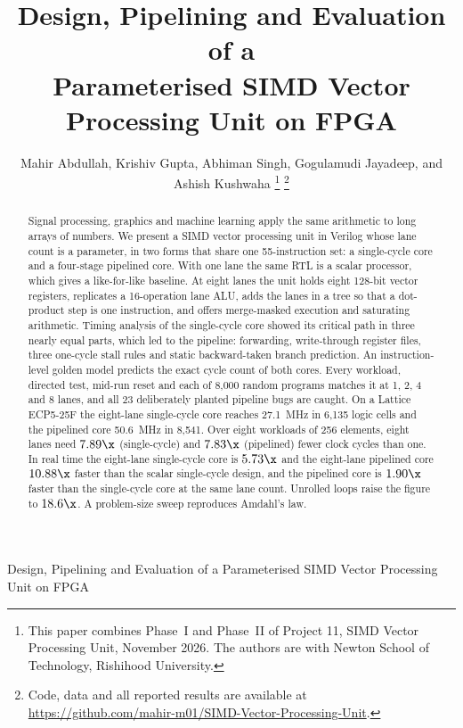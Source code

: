 \title{Design, Pipelining and Evaluation of a\\Parameterised SIMD Vector Processing Unit on FPGA}

\author{Mahir Abdullah, Krishiv Gupta, Abhiman Singh, Gogulamudi Jayadeep, and Ashish Kushwaha%
\thanks{This paper combines Phase~I and Phase~II of Project 11, SIMD Vector Processing Unit, November 2026.
The authors are with Newton School of Technology, Rishihood University.}%
\thanks{Code, data and all reported results are available at
\url{https://github.com/mahir-m01/SIMD-Vector-Processing-Unit}.}}

%
{Design, Pipelining and Evaluation of a Parameterised SIMD Vector Processing Unit on FPGA}

\maketitle

\begin{abstract}
Signal processing, graphics and machine learning apply the same arithmetic to long
arrays of numbers. We present a SIMD vector processing unit in Verilog whose lane
count is a parameter, in two forms that share one 55-instruction set: a
single-cycle core and a four-stage pipelined core. With one lane the same RTL is a
scalar processor, which gives a like-for-like baseline. At eight lanes the unit
holds eight 128-bit vector registers, replicates a 16-operation lane ALU, adds the
lanes in a tree so that a dot-product step is one instruction, and offers
merge-masked execution and saturating arithmetic. Timing analysis of the
single-cycle core showed its critical path in three nearly equal parts, which led to
the pipeline: forwarding, write-through register files, three one-cycle stall rules
and static backward-taken branch prediction. An instruction-level golden model
predicts the exact cycle count of both cores. Every workload, directed test,
mid-run reset and each of 8,000 random programs matches it at 1, 2, 4 and 8 lanes,
and all 23 deliberately planted pipeline bugs are caught. On a Lattice ECP5-25F the
eight-lane single-cycle core reaches 27.1~MHz in 6,135 logic cells and the pipelined
core 50.6~MHz in 8,541. Over eight workloads of 256 elements, eight lanes need
$7.89\x$ (single-cycle) and $7.83\x$ (pipelined) fewer clock cycles than one. In real
time the eight-lane single-cycle core is $5.73\x$ and the eight-lane pipelined core
$10.88\x$ faster than the scalar single-cycle design, and the pipelined core is
$1.90\x$ faster than the single-cycle core at the same lane count. Unrolled loops
raise the figure to $18.6\x$. A problem-size sweep reproduces Amdahl's law.
\end{abstract}

